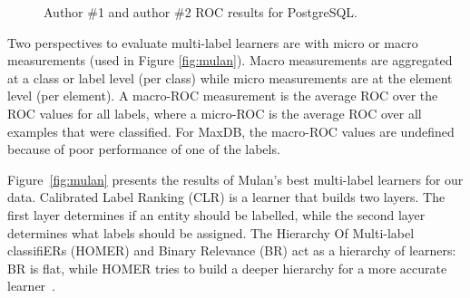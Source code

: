 \documentclass[smallextended]{svjour3}       %
\begin{document}
\begin{figure}
\centering
{}
\caption{Author \#1 and author \#2 ROC results for PostgreSQL.} 
\label{fig:pgcomp}
\end{figure}

Two perspectives to evaluate multi-label learners are with micro or macro measurements (used in Figure \ref{fig:mulan}).
Macro measurements are aggregated at a class or label level (per class) while micro measurements are at the element level (per element).
A macro-ROC measurement is the average ROC over the ROC values for all labels, where a micro-ROC is the average ROC over all examples that were classified. 
For MaxDB, the macro-ROC values are undefined because of poor performance of one of the labels.%

Figure~\ref{fig:mulan} presents the results of Mulan's best multi-label learners for our data. 
Calibrated Label Ranking (CLR) is a learner that builds two layers. The first layer determines if an entity should be labelled, while the second layer
determines what labels should be assigned.
The Hierarchy Of Multi-label classifiERs (HOMER) and Binary Relevance (BR) act as a hierarchy of learners: BR is flat, while HOMER tries to build a
deeper hierarchy for a more accurate learner~\cite{mulan}. 
\end{document}
